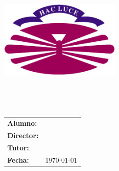 %
%
\begin{titlepage}
	\begin{center}
		\includegraphics[width=6cm]{./eps/logo_udc.eps}
		\vspace{2cm}

		{\Large{\textbf{\centro}}}
		\\
		{\it \large{\textbf{\departamento}}}
		\vspace{1cm}

		{\large {\sc \proyecto}\\{\curso}}
		\vspace{1cm}

		\textbf{\Large \titulo}
		\vspace{6cm}
	\end{center}

	\begin{flushright}
		\begin{tabular}{ll}
			\large{\textbf{Alumno:}}	&
			\large{\autor} \\

			\large{\textbf{Director:}}	&
			\large{\director} \\

			\large{\textbf{Tutor:}}		&
			\large{\tutor} \\

			\large{\textbf{Fecha:}}		&
			\large{\today} \\
		\end{tabular}
	\end{flushright}
\end{titlepage}
